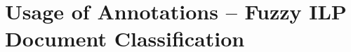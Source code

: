 \chapter{Usage of Annotations -- Fuzzy ILP Document Classification} \label{sec:ch80_fuzzy_ilp_chapter}

\graphicspath{{../img/ch80/}}




%

